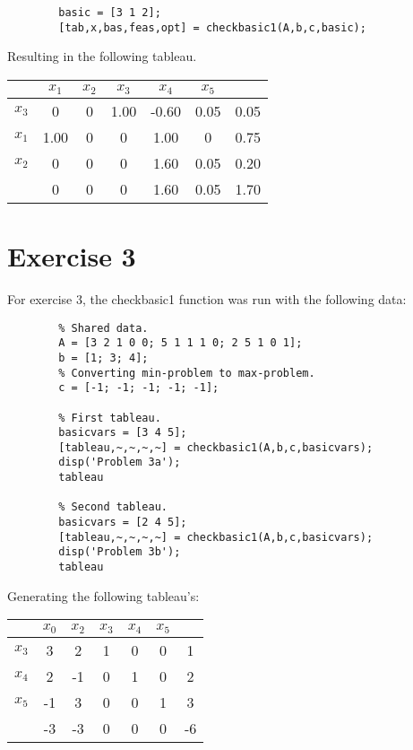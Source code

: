 \documentclass{article}
\begin{document}
    \begin{lstlisting}
        basic = [3 1 2];
        [tab,x,bas,feas,opt] = checkbasic1(A,b,c,basic);
    \end{lstlisting}

    Resulting in the following tableau.

    \begin{center}
        \begin{tabular}{ | c | c c c c c | c | }
            \hline
                   & $x_1$ & $x_2$ & $x_3$ & $x_4$ & $x_5$ &  \\
            \hline
            $x_3$ & 0  & 0   & 1.00 & -0.60   &  0.05   & 0.05  \\
            $x_1$ & 1.00  & 0      & 0    & 1.00&  0   & 0.75 \\
            $x_2$ & 0  & 0  & 0    & 1.60  & 0.05 & 0.20 \\
            \hline
                  & 0  & 0  & 0    & 1.60   &  0.05  & 1.70 \\
            \hline
        \end{tabular}
    \end{center}

\section*{Exercise 3}

    For exercise 3, the checkbasic1 function was run with the following data:

    \begin{lstlisting}
        % Shared data.
        A = [3 2 1 0 0; 5 1 1 1 0; 2 5 1 0 1];
        b = [1; 3; 4];
        % Converting min-problem to max-problem.
        c = [-1; -1; -1; -1; -1];

        % First tableau.
        basicvars = [3 4 5];
        [tableau,~,~,~,~] = checkbasic1(A,b,c,basicvars);
        disp('Problem 3a');
        tableau

        % Second tableau.
        basicvars = [2 4 5];
        [tableau,~,~,~,~] = checkbasic1(A,b,c,basicvars);
        disp('Problem 3b');
        tableau
    \end{lstlisting}

    Generating the following tableau's:

        \begin{center}
            \begin{tabular}{ | c | c c c c c | c | }
                \hline
                      & $x_0$ & $x_2$ & $x_3$ & $x_4$ & $x_5$ &  \\
                \hline
                $x_3$ & 3  & 2   & 1 & 0   &  0   & 1  \\
                $x_4$ & 2  & -1 & 0    & 1 &  0   & 2 \\
                $x_5$ & -1  & 3  & 0    & 0  & 1 & 3 \\
                \hline
                      & -3  & -3  & 0    & 0   &  0  & -6 \\
                \hline
            \end{tabular}
        \end{center}
\end{document}
